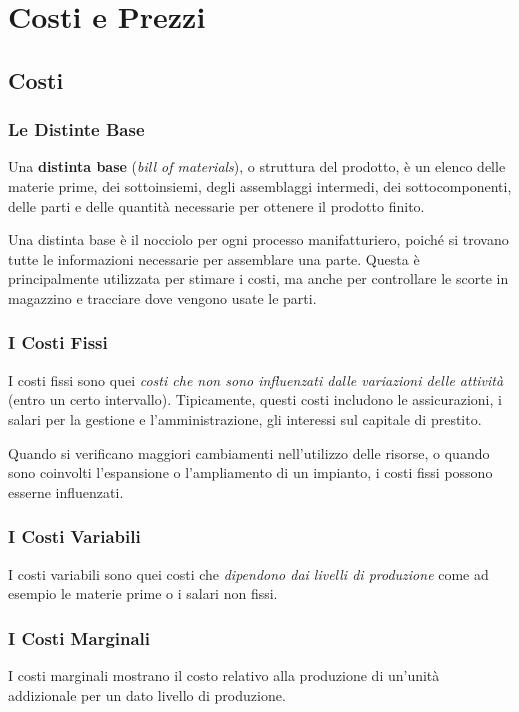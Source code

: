 \documentclass[a4paper,portrait,12pt]{article}
\theoremstyle{definition}
\begin{document}
\newpage
\section{Costi e Prezzi}

\subsection{Costi}

\subsubsection{Le Distinte Base}
Una \textbf{distinta base} (\emph{bill of materials}), o struttura del prodotto, è un elenco delle materie prime, dei sottoinsiemi, degli assemblaggi intermedi, dei sottocomponenti, delle parti e delle quantità necessarie per ottenere il prodotto finito.

Una distinta base è il nocciolo per ogni processo manifatturiero, poiché si trovano tutte le informazioni necessarie per assemblare una parte.
Questa è principalmente utilizzata per stimare i costi, ma anche per controllare le scorte in magazzino e tracciare dove vengono usate le parti.

\subsubsection{I Costi Fissi}
I costi fissi sono quei \emph{costi che non sono influenzati dalle variazioni delle attività} (entro un certo intervallo).
Tipicamente, questi costi includono le assicurazioni, i salari per la gestione e l'amministrazione, gli interessi sul capitale di prestito.

Quando si verificano maggiori cambiamenti nell'utilizzo delle risorse, o quando sono coinvolti l'espansione o l'ampliamento di un impianto, i costi fissi possono esserne influenzati.

\subsubsection{I Costi Variabili}
I costi variabili sono quei costi che \emph{dipendono dai livelli di produzione} come ad esempio le materie prime o i salari non fissi.

\subsubsection{I Costi Marginali}
I costi marginali mostrano il costo relativo alla produzione di un'unità addizionale per un dato livello di produzione.
\end{document}
